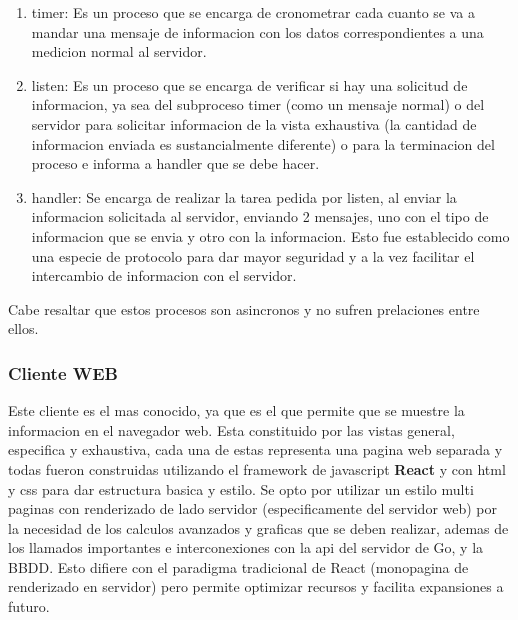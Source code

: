 \begin{itemize}
        \begin{enumerate}
            \item timer: Es un proceso que se encarga de cronometrar cada cuanto
                se va a mandar una mensaje de informacion con los datos
                correspondientes a una medicion normal al servidor.

            \item listen: Es un proceso que se encarga de verificar si hay una
                solicitud de informacion, ya sea del subproceso timer (como un
                mensaje normal) o del servidor para solicitar informacion de la
                vista exhaustiva (la cantidad de informacion enviada es sustancialmente
                diferente) o para la terminacion del proceso e informa a handler
                que se debe hacer.

            \item handler: Se encarga de realizar la tarea pedida por listen,
                al enviar la informacion solicitada al servidor, enviando 2 mensajes,
                uno con el tipo de informacion que se envia y otro con la informacion.
                Esto fue establecido como una especie de protocolo para dar mayor
                seguridad y a la vez facilitar el intercambio de informacion con
                el servidor.
        \end{enumerate}

        Cabe resaltar que estos procesos son asincronos y no sufren prelaciones
        entre ellos.
\end{itemize}

\subsubsection{Cliente WEB}

Este cliente es el mas conocido, ya que es el que permite que se muestre la
informacion en el navegador web. Esta constituido por las vistas general,
especifica y exhaustiva, cada una de estas representa una pagina web separada y
todas fueron construidas utilizando el framework de javascript \textbf{React}
y con html y css para dar estructura basica y estilo. Se opto por utilizar un
estilo multi paginas con renderizado de lado servidor (especificamente del
servidor web) por la necesidad de los calculos avanzados y graficas que
se deben realizar, ademas de los llamados importantes e interconexiones con la
api del servidor de Go, y la BBDD. Esto difiere con el paradigma tradicional de
React (monopagina de renderizado en servidor) pero permite optimizar recursos y
facilita expansiones a futuro.

